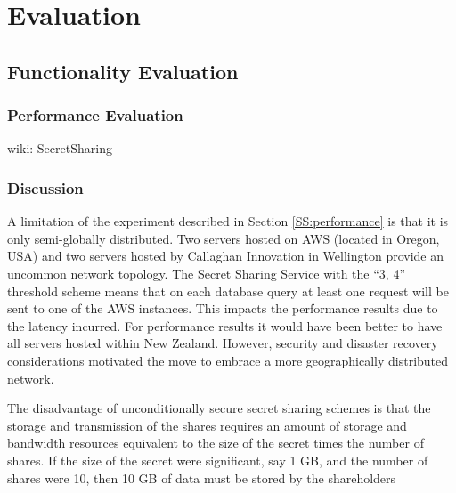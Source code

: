 \chapter{Evaluation}

\section{Functionality Evaluation}

\subsection{Performance Evaluation}

wiki: SecretSharing


\subsection{Discussion}

A limitation of the experiment described in Section \ref{SS:performance} is that it is only semi-globally distributed. Two servers hosted on AWS (located in Oregon, USA) and two servers hosted by Callaghan Innovation in Wellington provide an uncommon network topology. The Secret Sharing Service with the ``3, 4'' threshold scheme means that on each database query at least one request will be sent to one of the AWS instances. This impacts the performance results due to the latency incurred. For performance results it would have been better to have all servers hosted within New Zealand. However, security and disaster recovery considerations motivated the move to embrace a more geographically distributed network.

The disadvantage of unconditionally secure secret sharing schemes is that the storage and transmission of the shares requires an amount of storage and bandwidth resources equivalent to the size of the secret times the number of shares. If the size of the secret were significant, say 1 GB, and the number of shares were 10, then 10 GB of data must be stored by the shareholders
